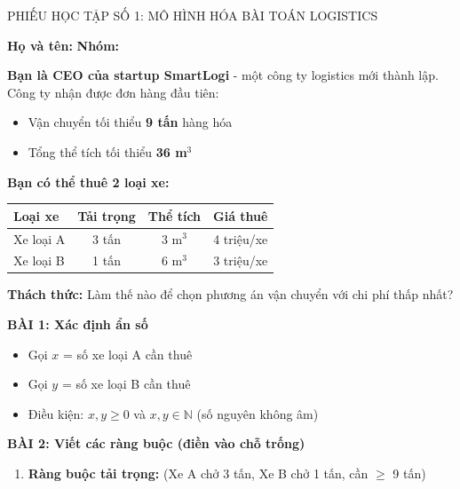 \documentclass[12pt,a4paper]{article}
\begin{document}
\begin{phieuhoctap}{PHIẾU HỌC TẬP SỐ 1: MÔ HÌNH HÓA BÀI TOÁN LOGISTICS}

\noindent\textbf{Họ và tên:} \underline{\hspace{6cm}} \hfill \textbf{Nhóm:} \underline{\hspace{2cm}}

\vspace{0.5cm}
\begin{tinhuong}
\textbf{Bạn là CEO của startup SmartLogi} - một công ty logistics mới thành lập. Công ty nhận được đơn hàng đầu tiên:
\begin{itemize}
\item Vận chuyển tối thiểu \textbf{9 tấn} hàng hóa
\item Tổng thể tích tối thiểu \textbf{36 m$^3$}
\end{itemize}

\textbf{Bạn có thể thuê 2 loại xe:}
\begin{center}
\begin{tabular}{|l|c|c|c|}
\hline
\textbf{Loại xe} & \textbf{Tải trọng} & \textbf{Thể tích} & \textbf{Giá thuê} \\
\hline
Xe loại A & 3 tấn & 3 m$^3$ & 4 triệu/xe \\
Xe loại B & 1 tấn & 6 m$^3$ & 3 triệu/xe \\
\hline
\end{tabular}
\end{center}

\textbf{Thách thức:} Làm thế nào để chọn phương án vận chuyển với chi phí thấp nhất?
\end{tinhuong}

\vspace{0.5cm}
\textbf{\color{accent}BÀI 1: Xác định ẩn số}
\begin{itemize}
\item Gọi $x$ = số xe loại A cần thuê
\item Gọi $y$ = số xe loại B cần thuê
\item Điều kiện: $x, y \ge 0$ và $x, y \in \mathbb{N}$ (số nguyên không âm)
\end{itemize}

\vspace{0.5cm}
\textbf{\color{accent}BÀI 2: Viết các ràng buộc (điền vào chỗ trống)}

\begin{enumerate}[label=\alph*)]
\item \textbf{Ràng buộc tải trọng:} (Xe A chở 3 tấn, Xe B chở 1 tấn, cần $\ge$ 9 tấn)


\end{enumerate}
\end{phieuhoctap}
\end{document}
